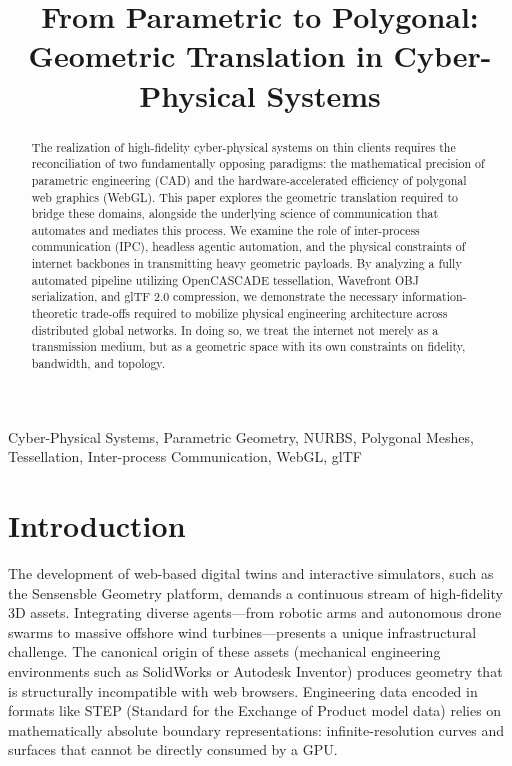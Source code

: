 \documentclass[conference]{IEEEtran}
\begin{document}
\title{From Parametric to Polygonal: Geometric Translation in Cyber-Physical Systems}

\author{}

\maketitle

\begin{abstract}
The realization of high-fidelity cyber-physical systems on thin clients requires the reconciliation of two fundamentally opposing paradigms: the mathematical precision of parametric engineering (CAD) and the hardware-accelerated efficiency of polygonal web graphics (WebGL). This paper explores the geometric translation required to bridge these domains, alongside the underlying science of communication that automates and mediates this process. We examine the role of inter-process communication (IPC), headless agentic automation, and the physical constraints of internet backbones in transmitting heavy geometric payloads. By analyzing a fully automated pipeline utilizing OpenCASCADE tessellation, Wavefront OBJ serialization, and glTF 2.0 compression, we demonstrate the necessary information-theoretic trade-offs required to mobilize physical engineering architecture across distributed global networks. In doing so, we treat the internet not merely as a transmission medium, but as a geometric space with its own constraints on fidelity, bandwidth, and topology.
\end{abstract}

\begin{IEEEkeywords}
Cyber-Physical Systems, Parametric Geometry, NURBS, Polygonal Meshes, Tessellation, Inter-process Communication, WebGL, glTF
\end{IEEEkeywords}

\section{Introduction}

The development of web-based digital twins and interactive simulators, such as the Sensensble Geometry platform, demands a continuous stream of high-fidelity 3D assets. Integrating diverse agents---from robotic arms and autonomous drone swarms to massive offshore wind turbines---presents a unique infrastructural challenge. The canonical origin of these assets (mechanical engineering environments such as SolidWorks or Autodesk Inventor) produces geometry that is structurally incompatible with web browsers. Engineering data encoded in formats like STEP (Standard for the Exchange of Product model data) relies on mathematically absolute boundary representations: infinite-resolution curves and surfaces that cannot be directly consumed by a GPU.
\end{document}
